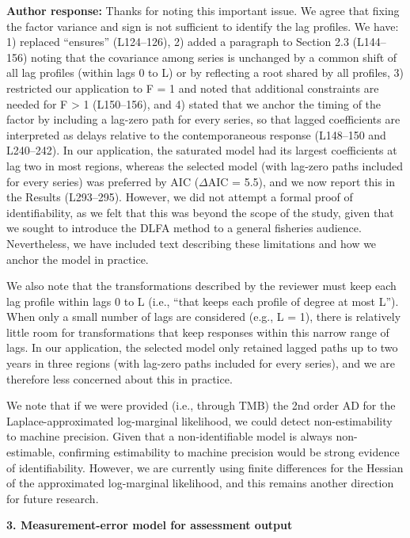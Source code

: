 \documentclass[11pt]{article}
\begin{document}
\textbf{Author response:} Thanks for noting this important issue. We
agree that fixing the factor variance and sign is not sufficient to
identify the lag profiles. We have: 1) replaced ``ensures'' (L124--126),
2) added a paragraph to Section 2.3 (L144--156) noting that the
covariance among series is unchanged by a common shift of all lag
profiles (within lags 0 to L) or by reflecting a root shared by all
profiles, 3) restricted our application to F = 1 and noted that
additional constraints are needed for F \textgreater{} 1 (L150--156),
and 4) stated that we anchor the timing of the factor by including a
lag-zero path for every series, so that lagged coefficients are
interpreted as delays relative to the contemporaneous response
(L148--150 and L240--242). In our application, the saturated model had
its largest coefficients at lag two in most regions, whereas the
selected model (with lag-zero paths included for every series) was
preferred by AIC (\(\Delta\)AIC = 5.5), and we now report this in the
Results (L293--295). However, we did not attempt a formal proof of
identifiability, as we felt that this was beyond the scope of the study,
given that we sought to introduce the DLFA method to a general fisheries
audience. Nevertheless, we have included text describing these
limitations and how we anchor the model in practice.

We also note that the transformations described by the reviewer must
keep each lag profile within lags 0 to L (i.e., ``that keeps each
profile of degree at most L''). When only a small number of lags are
considered (e.g., L = 1), there is relatively little room for
transformations that keep responses within this narrow range of lags. In
our application, the selected model only retained lagged paths up to two
years in three regions (with lag-zero paths included for every series),
and we are therefore less concerned about this in practice.

We note that if we were provided (i.e., through TMB) the 2nd
order AD for the Laplace-approximated log-marginal likelihood,
we could detect non-estimability to machine precision. Given that
a non-identifiable model is always non-estimable, confirming estimability
to machine precision would be strong evidence of identifiability. However, we are currently
using finite differences for the Hessian of the approximated log-marginal likelihood,
and this remains another direction for future research.

\textbf{3. Measurement-error model for assessment output}
\end{document}
